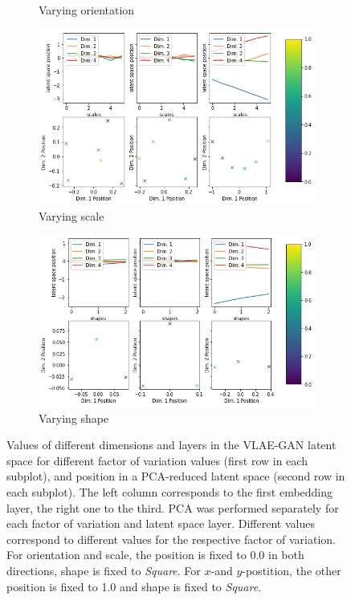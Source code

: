 \begin{figure}
\begin{subfigure}{.48\textwidth}
        \caption{Varying orientation}
    \end{subfigure}
    \hfill
    \begin{subfigure}{.48\textwidth}
        \centering
        \includegraphics[width=\textwidth]{images/latent_space_traversals/vlae_gan_dsprites_scale_latent_space_values.png}
        \caption{Varying scale}
    \end{subfigure}
    \vfill
    \begin{subfigure}{.48\textwidth}
        \centering
        \includegraphics[width=\textwidth]{images/latent_space_traversals/vlae_gan_dsprites_shape_latent_space_values.png}
        \caption{Varying shape}
    \end{subfigure}
    \caption[\ac{VLAE}-\ac{GAN} on dsprites: Latent Space Values]{Values of different dimensions and layers in the \ac{VLAE}-\ac{GAN} latent space for different factor of variation values (first row in each subplot), and position in a \ac{PCA}-reduced latent space (second row in each subplot). The left column corresponds to the first embedding layer, the right one to the third. \ac{PCA} was performed separately for each factor of variation and latent space layer. Different values correspond to different values for the respective factor of variation. For orientation and scale, the position is fixed to 0.0 in both directions, shape is fixed to \textit{Square}. For $x$-and $y$-postition, the other position is fixed to 1.0 and shape is fixed to \textit{Square}.}
    \label{fig:vlae_gan_dsprites_latent_space_values}
\end{figure}